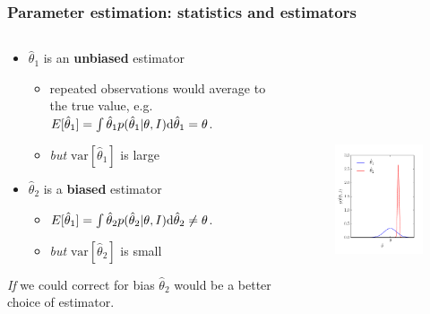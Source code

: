 \begin{frame}

\frametitle{Parameter estimation: statistics and estimators}
\label{parameterestimation:statisticsandestimators}

\begin{columns}
\begin{column}{0.55\textwidth}

\begin{itemize}
\item $\hat{\theta}_1$ is an \textbf{unbiased} estimator

\begin{itemize}
\item repeated observations would average to the true value, e.g. $E[\hat{\theta}_1] = \int \hat{\theta}_1 p(\hat{\theta}_1|\theta,I) {\rm d}\hat{\theta}_1 = \theta$.

\item \emph{but} $\text{var}[\hat{\theta}_1]$ is large

\end{itemize}

\item $\hat{\theta}_2$ is a \textbf{biased} estimator

\begin{itemize}
\item $E[\hat{\theta}_1] = \int \hat{\theta}_2 p(\hat{\theta}_2|\theta,I) {\rm d}\hat{\theta}_2 \ne \theta$.

\item \emph{but} $\text{var}[\hat{\theta}_2]$ is small

\end{itemize}

\end{itemize}

\emph{If} we could correct for bias $\hat{\theta}_2$ would be a better choice of estimator.

\end{column}
\begin{column}{0.45\textwidth}

\begin{figure}[htbp]
\centering
\includegraphics[keepaspectratio,width=\textwidth,height=250pt]{figures/estimator.pdf}
\label{estimator}
\end{figure}


\end{column}
\end{columns}
\end{frame}
